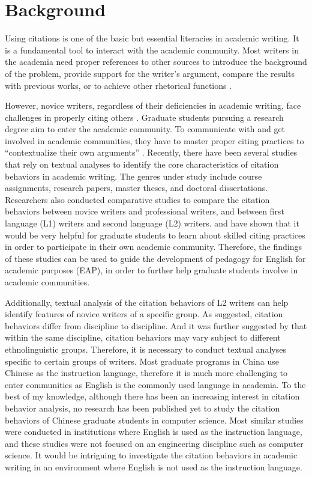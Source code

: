 \label{chap:intro}

\section{Background}
Using citations is one of the basic but essential literacies in academic writing. It is a fundamental tool to interact with the academic community. Most writers in the academia need proper references to other sources to introduce the background of the problem, provide support for the writer’s argument, compare the results with previous works, or to achieve other rhetorical functions \citep{petric_rhetorical_2007}.

However, novice writers, regardless of their deficiencies in academic writing, face challenges in properly citing others \citep{pecorari_plagiarism_2014}. Graduate students pursuing a research degree aim to enter the academic community. To communicate with and get involved in academic communities, they have to master proper citing practices to “contextualize their own arguments” \citep[p. 48]{wette_source_2017}. Recently, there have been several studies that rely on textual analyses to identify the core characteristics of citation behaviors in academic writing. The genres under study include course assignments, research papers, master theses, and doctoral dissertations. Researchers also conducted comparative studies to compare the citation behaviors between novice writers and professional writers, and between first language (L1) writers and second language (L2) writers. \citet{duff_second_2007} and \citet{lave_situated_1991} have shown that it would be very helpful for graduate students to learn about skilled citing practices in order to participate in their own academic community. Therefore, the findings of these studies can be used to guide the development of pedagogy for English for academic purposes (EAP), in order to further help graduate students involve in academic communities.

Additionally, textual analysis of the citation behaviors of L2 writers can help identify features of novice writers of a specific group. As \citet{thompson_looking_2001} suggested, citation behaviors differ from discipline to discipline. And it was further suggested by \citet{hu_disciplinary_2014} that within the same discipline, citation behaviors may vary subject to different ethnolinguistic groups. Therefore, it is necessary to conduct textual analyses specific to certain groups of writers. Most graduate programs in China use Chinese as the instruction language, therefore it is much more challenging to enter communities as English is the commonly used language in academia. To the best of my knowledge, although there has been an increasing interest in citation behavior analysis, no research has been published yet to study the citation behaviors of Chinese graduate students in computer science. Most similar studies were conducted in institutions where English is used as the instruction language, and these studies were not focused on an engineering discipline such as computer science. It would be intriguing to investigate the citation behaviors in academic writing in an environment where English is not used as the instruction language.

